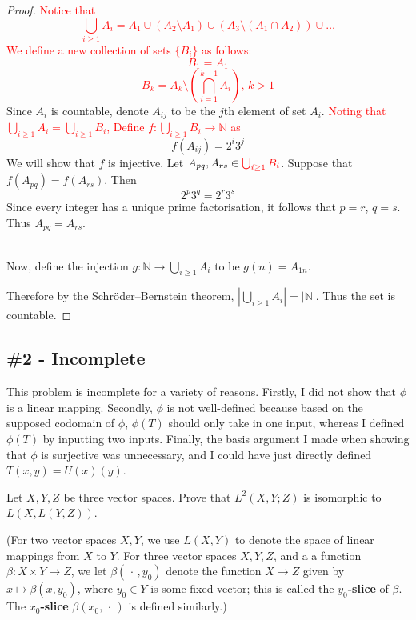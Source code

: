 \documentclass{article}
\theoremstyle{plain} %
\numberwithin{thm}{section} %
\theoremstyle{definition}
\begin{document}
    \begin{proof}
        \textcolor{red}{Notice that \[\bigcup_{i \ge 1} A_i = A_1 \cup (A_2 \setminus A_1) \cup (A_3 \setminus (A_1 \cap A_2)) \cup \dots\] We define a new collection of sets \(\{B_i\}\) as follows:}
        \textcolor{red}{
            \[
                B_1 = A_1
            \] 
            \[
                B_k = A_k \setminus \left(\bigcap_{i=1}^{k-1} A_i\right) \text{, } k>1
            \]
        }
        Since \(A_i\) is countable, denote \(A_{ij}\) to be the \(j\)th element of set \(A_i\). \textcolor{red}{Noting that \(\bigcup_{i \ge 1} A_i = \bigcup_{i \ge 1} B_i\), Define \(f: \bigcup_{i \ge 1} B_i \to \mathbb{N}\) as }
        \[
            f(A_{ij})=2^{i}3^{j}
        \]
        We will show that \(f\) is injective. Let \(A_{pq}, A_{rs} \in \textcolor{red}{\bigcup_{i \geq 1} B_i}\). Suppose that \(f(A_{pq} ) = f(A_{rs} )\). Then
        \[
            2^p 3^q = 2^r 3^s
        \]
        Since every integer has a unique prime factorisation, it follows that \(p = r\), \(q = s\). Thus \(A_{pq} = A_{rs} \).

        \noindent \\ Now, define the injection \(g: \mathbb{N} \to \bigcup_{i\geq 1} A_i\) to be \(g(n) = A_{1n} \). 
        
        \noindent Therefore by the Schröder–Bernstein theorem, \(|\bigcup_{i\geq 1} A_i | = |\mathbb{N} |\). Thus the set is countable.

    \end{proof}

    \subsection{\#2 - Incomplete}

    This problem is incomplete for a variety of reasons. Firstly, I did not show that \(\phi\) is a linear mapping. Secondly, \(\phi\) is not well-defined because based on the supposed codomain of \(\phi\), \(\phi (T)\) should only take in one input, whereas I defined \(\phi (T)\) by inputting two inputs. Finally, the basis argument I made when showing that \(\phi\) is surjective was unnecessary, and I could have just directly defined \(T(x,y) = U(x)(y)\).

    \bigskip

    Let $X,Y,Z$ be three vector spaces. Prove that $L^2(X,Y;Z)$ is isomorphic to $L(X,L(Y,Z))$.

   (For two vector spaces $X,Y$, we use $L(X,Y)$ to denote the space of linear mappings from $X$ to $Y$. For three vector spaces $X,Y,Z$, and a a function $\beta:X\times Y\rightarrow Z$, we let $\beta(\,\cdot\,,y_0)$ denote the function $X\rightarrow Z$ given by $x\mapsto \beta(x,y_0)$, where $y_0\in Y$ is some fixed vector; this is called the \textbf{$y_0$-slice} of $\beta$. The \textbf{$x_0$-slice} $\beta(x_0, \,\cdot\,)$ is defined similarly.)
\end{document}
